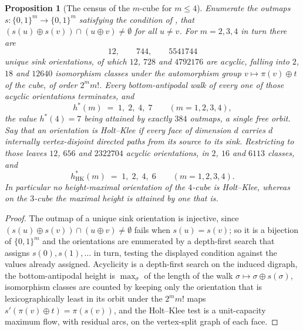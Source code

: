 \documentclass[11pt]{article}
\theoremstyle{plain}
\newtheorem{proposition}[theorem]{Proposition}
\theoremstyle{definition}
\begin{document}
\begin{proposition}[The census of the $m$-cube for $m\le4$]\label{prop:auso-census}
Enumerate the outmaps $s:\{0,1\}^{m}\to\{0,1\}^{m}$ satisfying the condition of
, that $(s(u)\oplus s(v))\cap(u\oplus v)\ne\emptyset$
for all $u\ne v$. For $m=2,3,4$ in turn there are
\[
  12,\qquad 744,\qquad 5541744
\]
unique sink orientations, of which $12$, $728$ and $4792176$ are acyclic,
falling into $2$, $18$ and $12640$ isomorphism classes under the automorphism
group $v\mapsto\pi(v)\oplus t$ of the cube, of order $2^{m}m!$. Every
bottom-antipodal walk of every one of those acyclic orientations terminates,
and
\[
  h^{\ast}(m)\;=\;1,\;2,\;4,\;7\qquad(m=1,2,3,4),
\]
the value $h^{\ast}(4)=7$ being attained by exactly $384$ outmaps, a single free
orbit. Say that an orientation is \emph{Holt--Klee} if every face of dimension
$d$ carries $d$ internally vertex-disjoint directed paths from its source to its
sink. Restricting to those leaves $12$, $656$ and $2322704$ acyclic
orientations, in $2$, $16$ and $6113$ classes, and
\[
  h^{\ast}_{\mathrm{HK}}(m)\;=\;1,\;2,\;4,\;6\qquad(m=1,2,3,4).
\]
In particular no height-maximal orientation of the $4$-cube is Holt--Klee,
whereas on the $3$-cube the maximal height is attained by one that is.
\end{proposition}

\begin{proof}
The outmap of a unique sink orientation is injective, since
$(s(u)\oplus s(v))\cap(u\oplus v)\ne\emptyset$ fails when $s(u)=s(v)$; so it is
a bijection of $\{0,1\}^{m}$ and the orientations are enumerated by a
depth-first search that assigns $s(0),s(1),\dots$ in turn, testing the
displayed condition against the values already assigned. Acyclicity is a
depth-first search on the induced digraph, the bottom-antipodal height is
$\max_{\sigma}$ of the length of the walk $\sigma\mapsto\sigma\oplus s(\sigma)$,
isomorphism classes are counted by keeping only the orientation that is
lexicographically least in its orbit under the $2^{m}m!$ maps
$s'(\pi(v)\oplus t)=\pi(s(v))$, and the Holt--Klee test is a unit-capacity
maximum flow, with residual arcs, on the vertex-split graph of each face.
\end{proof}
\end{document}
